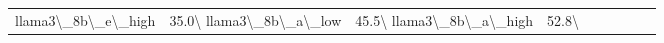 \begin{table}[htbp]
{\begin{tabular}{lcccccccc}
llama3\textbackslash{}_8b\textbackslash{}_e\textbackslash{}_high & 35.0\textbackslash{}%
llama3\textbackslash{}_8b\textbackslash{}_a\textbackslash{}_low & 45.5\textbackslash{}%
llama3\textbackslash{}_8b\textbackslash{}_a\textbackslash{}_high & 52.8\textbackslash{}%

\end{tabular}}
\end{table}
